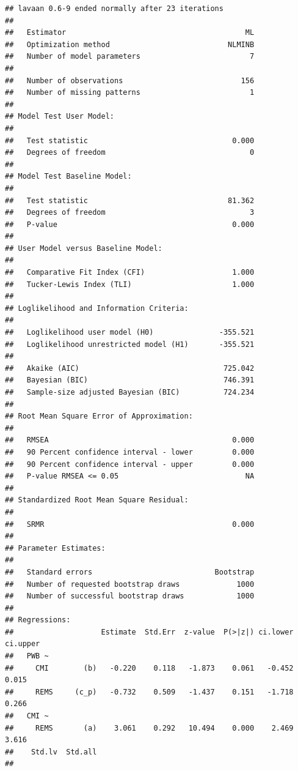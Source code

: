 \documentclass[
]{book}
\begin{document}
\begin{verbatim}
## lavaan 0.6-9 ended normally after 23 iterations
## 
##   Estimator                                         ML
##   Optimization method                           NLMINB
##   Number of model parameters                         7
##                                                       
##   Number of observations                           156
##   Number of missing patterns                         1
##                                                       
## Model Test User Model:
##                                                       
##   Test statistic                                 0.000
##   Degrees of freedom                                 0
## 
## Model Test Baseline Model:
## 
##   Test statistic                                81.362
##   Degrees of freedom                                 3
##   P-value                                        0.000
## 
## User Model versus Baseline Model:
## 
##   Comparative Fit Index (CFI)                    1.000
##   Tucker-Lewis Index (TLI)                       1.000
## 
## Loglikelihood and Information Criteria:
## 
##   Loglikelihood user model (H0)               -355.521
##   Loglikelihood unrestricted model (H1)       -355.521
##                                                       
##   Akaike (AIC)                                 725.042
##   Bayesian (BIC)                               746.391
##   Sample-size adjusted Bayesian (BIC)          724.234
## 
## Root Mean Square Error of Approximation:
## 
##   RMSEA                                          0.000
##   90 Percent confidence interval - lower         0.000
##   90 Percent confidence interval - upper         0.000
##   P-value RMSEA <= 0.05                             NA
## 
## Standardized Root Mean Square Residual:
## 
##   SRMR                                           0.000
## 
## Parameter Estimates:
## 
##   Standard errors                            Bootstrap
##   Number of requested bootstrap draws             1000
##   Number of successful bootstrap draws            1000
## 
## Regressions:
##                    Estimate  Std.Err  z-value  P(>|z|) ci.lower ci.upper
##   PWB ~                                                                 
##     CMI        (b)   -0.220    0.118   -1.873    0.061   -0.452    0.015
##     REMS     (c_p)   -0.732    0.509   -1.437    0.151   -1.718    0.266
##   CMI ~                                                                 
##     REMS       (a)    3.061    0.292   10.494    0.000    2.469    3.616
##    Std.lv  Std.all
##                   

\end{verbatim}
\end{document}

